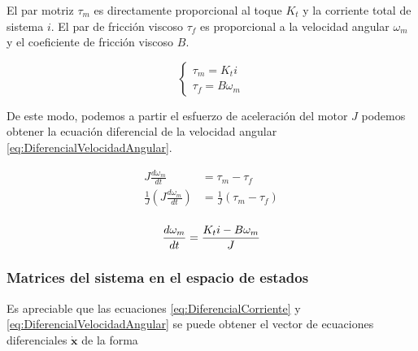 El par motriz $\tau_m$ es directamente proporcional al toque $K_t$ y la corriente
total de sistema $i$. El par de fricción viscoso $\tau_f$ es proporcional a
la velocidad angular $\omega_m$ y el coeficiente de fricción viscoso $B$.

\begin{equation*}
  \begin{cases}
    \tau_m = K_t i\\
    \tau_f = B \omega_m
  \end{cases}
\end{equation*}

De este modo, podemos a partir el esfuerzo de aceleración del motor $J$
podemos obtener la ecuación diferencial de la velocidad angular
\eqref{eq:DiferencialVelocidadAngular}.

\begin{equation*}
  \begin{aligned}
    J\frac{d\omega_m}{dt} &= \tau_m - \tau_f\\
   \frac1J  \left(
      J\frac{d\omega_m}{dt}
    \right)
   &=
   \frac1J  \left(
      \tau_m - \tau_f
    \right)\\
  \end{aligned}
\end{equation*}

\begin{equation}
  \frac{d\omega_m}{dt} = \frac{K_t i - B \omega_m}{J}\\
  \label{eq:DiferencialVelocidadAngular}
\end{equation}


\subsubsection{Matrices del sistema en el espacio de estados}
Es apreciable que las ecuaciones \eqref{eq:DiferencialCorriente} y
\eqref{eq:DiferencialVelocidadAngular} se puede obtener el
vector de ecuaciones diferenciales
$\dot{\mathbf{x}}$ de la forma

